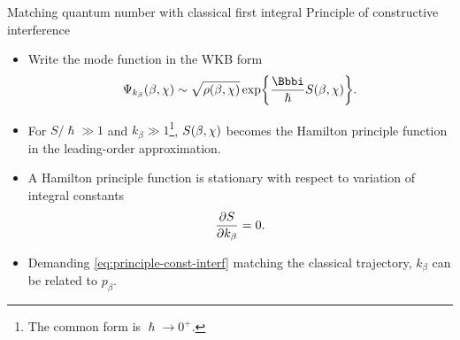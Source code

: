 \documentclass[9pt]{beamer}
\begin{document}
\begin{frame}%
{Matching quantum number with classical first integral}%
{Principle of constructive interference}
\begin{itemize}
\item Write the mode function in the WKB form
\begin{align}
\rfun{\Psi_{k_\beta}}{\beta,\chi} \sim \sqrt{\rfun{\rho}{\beta,\chi}}\,
\cfun{\exp}{\frac{\ii}{\hslash}\rfun{S}{\beta,\chi}}.
\end{align}

\item For $S/\hslash \gg 1$ and $k_\beta \gg 1$\footnote{The common form is
$\hslash\to 0^+$.}, ${S}\mathopen{}\left(\beta,\chi\right)\mathclose{}$ becomes the Hamilton principle
function in the leading-order approximation.

\item A Hamilton principle function is stationary with respect to variation of
integral constants
\begin{align}
{\frac{\partial{S}}{\partial{k_\beta}}} = 0.
\label{eq:principle-const-interf}
\end{align}

\item Demanding \cref{eq:principle-const-interf} matching the classical
trajectory, $k_\beta$ can be related to $p_\beta$.
\end{itemize}
\end{frame}
\end{document}

